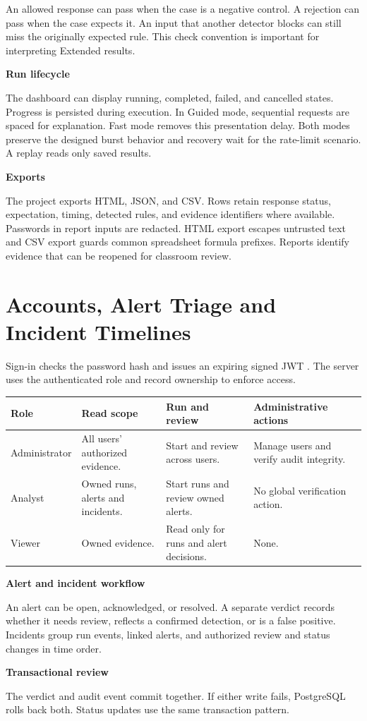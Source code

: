 \documentclass[11pt,a4paper,oneside]{report}
\newcommand{\topic}[1]{\smallskip\noindent\textbf{#1}\par\nobreak\vspace{-.39em}}
\newcommand{\sheet}[1]{\clearpage\section{#1}}
\newcommand{\tabletitle}[1]{\captionof{table}{#1}\smallskip}
\begin{document}
An allowed response can pass when the case is a negative control. A rejection can pass when the case expects it. An input that another detector blocks can still miss the originally expected rule. This check convention is important for interpreting Extended results.

\topic{Run lifecycle}
The dashboard can display running, completed, failed, and cancelled states. Progress is persisted during execution. In Guided mode, sequential requests are spaced for explanation. Fast mode removes this presentation delay. Both modes preserve the designed burst behavior and recovery wait for the rate-limit scenario. A replay reads only saved results.

\topic{Exports}
The project exports HTML, JSON, and CSV. Rows retain response status, expectation, timing, detected rules, and evidence identifiers where available. Passwords in report inputs are redacted. HTML export escapes untrusted text and CSV export guards common spreadsheet formula prefixes. Reports identify evidence that can be reopened for classroom review.

\sheet{Accounts, Alert Triage and Incident Timelines}
Sign-in checks the password hash and issues an expiring signed JWT \cite{jwt}. The server uses the authenticated role and record ownership to enforce access.

\tabletitle{Role matrix for the project workflow}
\begin{tabularx}{\linewidth}{@{}lYYY@{}}\toprule
\textbf{Role} & \textbf{Read scope} & \textbf{Run and review} & \textbf{Administrative actions}\\\midrule
Administrator & All users' authorized evidence. & Start and review across users. & Manage users and verify audit integrity.\\
Analyst & Owned runs, alerts and incidents. & Start runs and review owned alerts. & No global verification action.\\
Viewer & Owned evidence. & Read only for runs and alert decisions. & None.\\
\bottomrule\end{tabularx}

\topic{Alert and incident workflow}
An alert can be open, acknowledged, or resolved. A separate verdict records whether it needs review, reflects a confirmed detection, or is a false positive. Incidents group run events, linked alerts, and authorized review and status changes in time order.

\topic{Transactional review}
The verdict and audit event commit together. If either write fails, PostgreSQL rolls back both. Status updates use the same transaction pattern.
\end{document}
